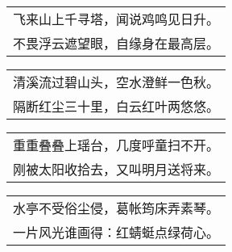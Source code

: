 \nopagebreak%
\nopagebreak%
\noindent\begin{minipage}{\linewidth}
  \vskip-3pt\begin{table}[H]
    \centering
    \begin{tabular}{@{}l@{}}
飞来山上千寻塔，闻说鸡鸣见日升。\\
不畏浮云遮望眼，自缘身在最高层。
    \end{tabular}
  \end{table}
\end{minipage}
\vspace{1cm}


\nopagebreak%
\nopagebreak%
\noindent\begin{minipage}{\linewidth}
  \vskip-3pt\begin{table}[H]
    \centering
    \begin{tabular}{@{}l@{}}
清溪流过碧山头，空水澄鲜一色秋。\\
隔断红尘三十里，白云红叶两悠悠。
    \end{tabular}
  \end{table}
\end{minipage}
\vspace{1cm}


\nopagebreak%
\nopagebreak%
\noindent\begin{minipage}{\linewidth}
  \vskip-3pt\begin{table}[H]
    \centering
    \begin{tabular}{@{}l@{}}
重重叠叠上瑶台，几度呼童扫不开。\\
刚被太阳收拾去，又叫明月送将来。
    \end{tabular}
  \end{table}
\end{minipage}
\vspace{1cm}


\nopagebreak%
\nopagebreak%
\noindent\begin{minipage}{\linewidth}
  \vskip-3pt\begin{table}[H]
    \centering
    \begin{tabular}{@{}l@{}}
水亭不受俗尘侵，葛帐筠床弄素琴。\\
一片风光谁画得：红蜻蜓点绿荷心。
    \end{tabular}
  \end{table}
\end{minipage}
\vspace{1cm}


